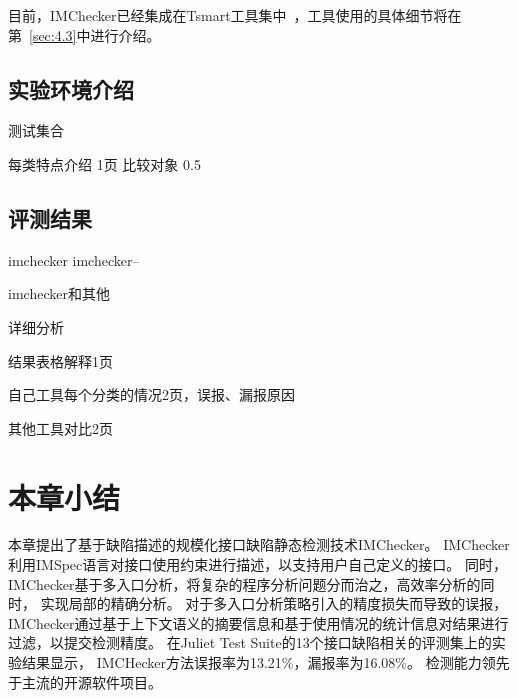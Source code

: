 目前，IMChecker已经集成在Tsmart工具集中~\cite{tsmart}，工具使用的具体细节将在第~\ref{sec:4.3}中进行介绍。
\subsection{实验环境介绍}
测试集合

每类特点介绍
1页
比较对象
0.5
\subsection{评测结果}
imchecker imchecker--

imchecker和其他

详细分析

结果表格解释1页

自己工具每个分类的情况2页，误报、漏报原因

其他工具对比2页


\section{本章小结}
\label{sec:3.5}
本章提出了基于缺陷描述的规模化接口缺陷静态检测技术IMChecker。
IMChecker利用IMSpec语言对接口使用约束进行描述，以支持用户自己定义的接口。
同时，IMChecker基于多入口分析，将复杂的程序分析问题分而治之，高效率分析的同时，
实现局部的精确分析。
对于多入口分析策略引入的精度损失而导致的误报，
IMChecker通过基于上下文语义的摘要信息和基于使用情况的统计信息对结果进行过滤，以提交检测精度。
在Juliet Test Suite的13个接口缺陷相关的评测集上的实验结果显示，
IMCHecker方法误报率为13.21\%，漏报率为16.08\%。
检测能力领先于主流的开源软件项目。
